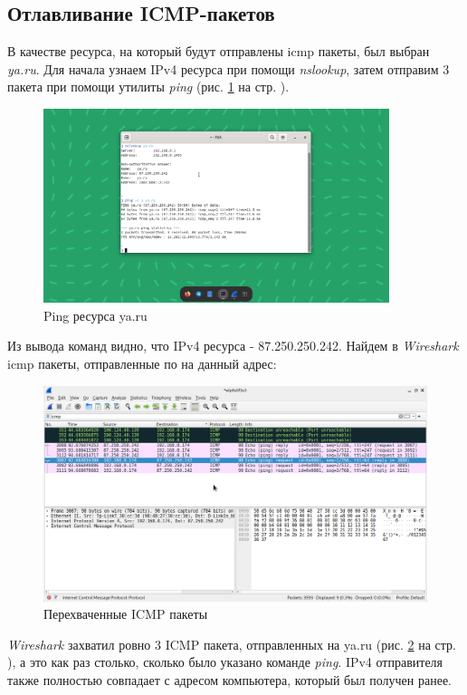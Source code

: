 \documentclass[a4paper]{article}
\begin{document}
  \subsection{Отлавливание ICMP-пакетов}
  В качестве ресурса, на который будут отправлены icmp пакеты, был выбран \textit{ya.ru}.
  Для начала узнаем IPv4 ресурса при помощи \textit{nslookup}, затем отправим 3 пакета при 
  помощи утилиты \textit{ping} (рис. \ref{img:0005} на стр. \pageref{img:0005}).
  \begin{figure}[H]
    \centering
    \includegraphics[width=0.9\textwidth]{01_0005}
    \caption{Ping ресурса ya.ru}
    \label{img:0005}
  \end{figure}
  Из вывода команд видно, что IPv4 ресурса - 87.250.250.242. Найдем в \textit{Wireshark}
  icmp пакеты, отправленные по на данный адрес:
  \begin{figure}[H]
    \centering
    \includegraphics[width=1.0\textwidth]{01_0006}
    \caption{Перехваченные ICMP пакеты}
    \label{img:0006}
  \end{figure}
  \textit{Wireshark} захватил ровно 3 ICMP пакета, отправленных на ya.ru (рис. \ref{img:0006}
  на стр. \pageref{img:0006}), а это как раз столько, сколько было указано команде \textit{ping}.
  IPv4 отправителя также полностью совпадает с адресом компьютера, который был получен ранее.
\end{document}
